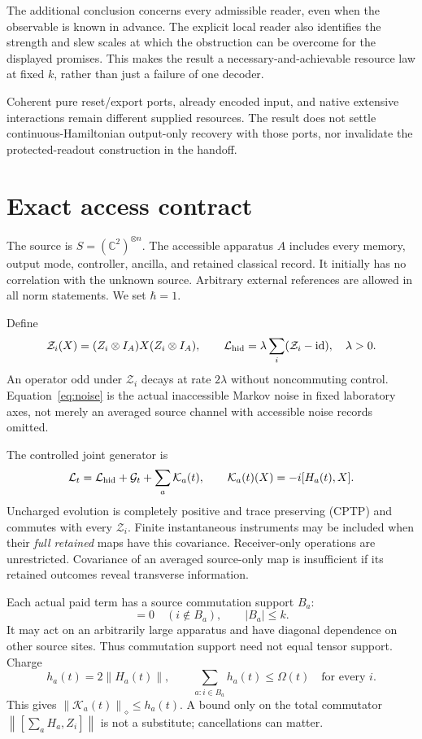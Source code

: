 \documentclass[11pt,a4paper]{article}
\newcommand{\id}{\operatorname{id}}
\newcommand{\norm}[1]{\left\lVert #1\right\rVert}
\newcommand{\Kcal}{\mathcal K}
\newcommand{\Zcal}{\mathcal Z}
\newcommand{\Gcal}{\mathcal G}
\newcommand{\Lcal}{\mathcal L}
\begin{document}
The additional conclusion concerns every admissible reader, even when the observable is known in advance. The explicit local reader also identifies the strength and slew scales at which the obstruction can be overcome for the displayed promises. This makes the result a necessary-and-achievable resource law at fixed $k$, rather than just a failure of one decoder.

Coherent pure reset/export ports, already encoded input, and native extensive interactions remain different supplied resources. The result does not settle continuous-Hamiltonian output-only recovery with those ports, nor invalidate the protected-readout construction in the handoff.

\section{Exact access contract}
\label{sec:model}

The source is $S=(\mathbb C^2)^{\otimes n}$. The accessible apparatus $A$ includes every memory, output mode, controller, ancilla, and retained classical record. It initially has no correlation with the unknown source. Arbitrary external references are allowed in all norm statements. We set $\hbar=1$.

Define
\begin{equation}
 \Zcal_i(X)=(Z_i\otimes I_A)X(Z_i\otimes I_A),\qquad
 \Lcal_{\rm hid}=\lambda\sum_i(\Zcal_i-\id),\quad\lambda>0.
 \label{eq:noise}
\end{equation}
An operator odd under $\Zcal_i$ decays at rate $2\lambda$ without noncommuting control. Equation~\eqref{eq:noise} is the actual inaccessible Markov noise in fixed laboratory axes, not merely an averaged source channel with accessible noise records omitted.

The controlled joint generator is
\begin{equation}
 \Lcal_t=\Lcal_{\rm hid}+\Gcal_t+\sum_a\Kcal_a(t),\qquad
 \Kcal_a(t)(X)=-i[H_a(t),X].
\end{equation}
Uncharged evolution is completely positive and trace preserving (CPTP) and commutes with every $\Zcal_i$. Finite instantaneous instruments may be included when their \emph{full retained} maps have this covariance. Receiver-only operations are unrestricted. Covariance of an averaged source-only map is insufficient if its retained outcomes reveal transverse information.

Each actual paid term has a source commutation support $B_a$:
\begin{equation}
 [H_a(t),Z_i\otimes I_A]=0\quad(i\notin B_a),\qquad |B_a|\le k.
\end{equation}
It may act on an arbitrarily large apparatus and have diagonal dependence on other source sites. Thus commutation support need not equal tensor support. Charge
\begin{equation}
 h_a(t)=2\norm{H_a(t)},\qquad
 \sum_{a:i\in B_a}h_a(t)\le\Omega(t)\quad\text{for every }i.
 \label{eq:budget}
\end{equation}
This gives $\norm{\Kcal_a(t)}_\diamond\le h_a(t)$. A bound only on the total commutator $\norm{[\sum_aH_a,Z_i]}$ is not a substitute; cancellations can matter.
\end{document}
